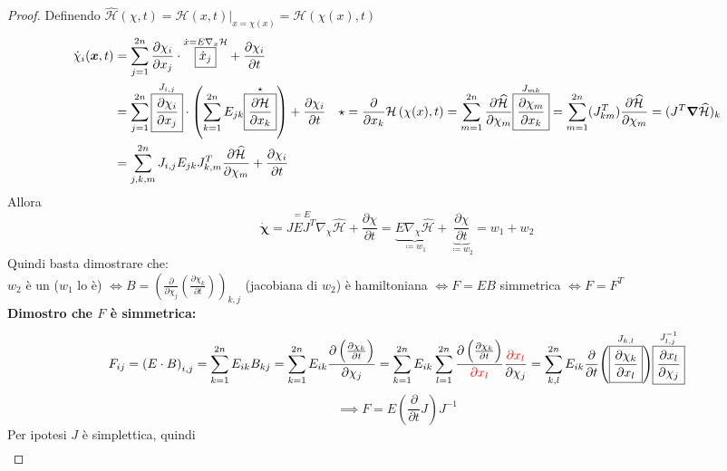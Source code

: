 \documentclass[a4paper,10pt]{article}
\theoremstyle{definition}
\newcommand{\bv}{\boldsymbol} %
\theoremstyle{indentdefinition}
\theoremstyle{indenttheorem}
\theoremstyle{myremark}
\theoremstyle{indentgeneral}
\begin{document}
\begin{proof}
Definendo $\widehat{\mathcal{H}}\left(\chi,t\right)=\left.\mathcal{H}\left(x,t\right)\right|_{x=\chi\left(x\right)}=\mathcal{H}\left(\chi(x),t\right)$
\begin{align*}
\dot{\chi}_{i}(\bv{x},t) &=\sum_{j=1}^{2n}\frac{\partial\chi_{i}}{\partial x_{j}}\cdot\overset{\dot{x}=E\nabla_{x}\mathcal{H}}{\boxed{\dot{x}_{j}}}+\frac{\partial\chi_{i}}{\partial t} \\
&=\sum_{j=1}^{2n}\overset{J_{i,j}}{\boxed{\frac{\partial\chi_{i}}{\partial x_{j}}}}\cdot\left(\sum_{k=1}^{2n}E_{jk}\overset{\star}{\boxed{\frac{\partial\mathcal{H}}{\partial x_{k}}}}\right)+\frac{\partial\chi_{i}}{\partial t} \quad \star=\frac{\partial}{\partial x_k}\mathcal{H}\left(\chi(x),t\right)=\sum_{m=1}^{2n}\frac{\partial\widehat{\mathcal{H}}}{\partial \chi_m}\overset{J_{mk}}{\boxed{\frac{\partial\chi_m}{\partial x_k}}}=\sum_{m=1}^{2n}(J_{km}^T)\frac{\partial\widehat{\mathcal{H}}}{\partial \chi_m}=(J^T\grad\widehat{\mathcal{H}})_k\\
&=\sum_{j,k,m}^{2n}J_{i,j}E_{jk}J_{k,m}^{T}\frac{\partial\widehat{\mathcal{H}}}{\partial\chi_{m}}+\frac{\partial\chi_{i}}{\partial t}
\end{align*}
Allora $$\dot{\bv{\chi}}=\overset{=E}{\boxed{JEJ^{T}}}\nabla_{\chi}\widehat{\mathcal{H}}+\frac{\partial\chi}{\partial t}=\underbrace{E\nabla_{\chi}\widehat{\mathcal{H}}}_{\coloneqq w_1}+\underbrace{\frac{\partial\chi}{\partial t}}_{\coloneqq w_2}=w_{1}+w_{2}$$
Quindi basta dimostrare che: \\
$w_{2}$ è un 
($w_{1}$ lo è) $\iff B=\left(\frac{\partial}{\partial\chi_{j}}\left(\frac{\partial\chi_{k}}{\partial t}\right)\right)_{k,j}$ (jacobiana di $w_2$)
è hamiltoniana $\iff F=EB$ simmetrica $\iff F=F^T$ \\
\textbf{Dimostro che $F$ è simmetrica:}
\[
F_{ij}=\left(E\cdot B\right)_{i,j}=\sum_{k=1}^{2n}E_{ik}B_{kj}=\sum_{k=1}^{2n}E_{ik}\frac{\partial\left(\frac{\partial\chi_{k}}{\partial t}\right)}{\partial\chi_{j}}=\sum_{k=1}^{2n}E_{ik}\sum_{l=1}^{2n}\frac{\partial\left(\frac{\partial\chi_{k}}{\partial t}\right)}{ \textcolor{red}{\partial x_{l}}}\frac{\textcolor{red}{\partial x_{l}}}{\partial\chi_{j}}=\sum_{k,l}^{2n}E_{ik}\frac{\partial}{\partial t}\overset{J_{k,l}}{\left(\boxed{\frac{\partial\chi_{k}}{\partial x_{l}}}\right)}\overset{J_{l,j}^{-1}}{\boxed{\frac{\partial x_{l}}{\partial\chi_{j}}}}
\]
$$\implies F=E\left(\frac{\partial}{\partial t}J\right)J^{-1}$$
Per ipotesi $J$ è simplettica, quindi
\begin{align*}

\end{align*}
\end{proof}
\end{document}

